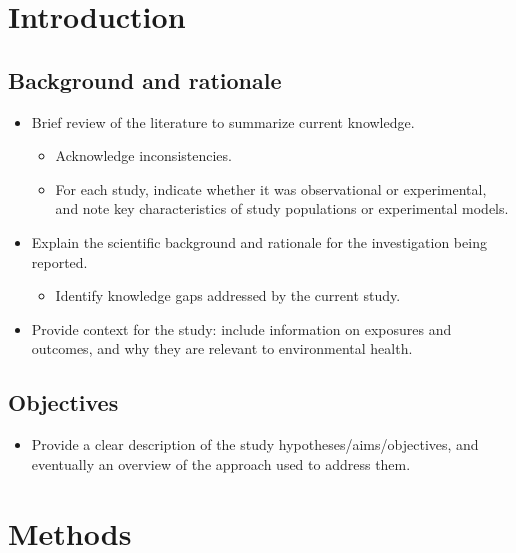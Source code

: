 \documentclass[
  letterpaper,
  DIV=11,
  numbers=noendperiod]{scrartcl}
\providecommand{\tightlist}{%
  \setlength{\itemsep}{0pt}\setlength{\parskip}{0pt}}\usepackage{longtable,booktabs,array}
\begin{document}
\hypertarget{sec-intro}{%
\section{Introduction}\label{sec-intro}}

\hypertarget{sec-background}{%
\subsection{Background and rationale}\label{sec-background}}

\begin{itemize}
\tightlist
\item
  Brief review of the literature to summarize current knowledge.

  \begin{itemize}
  \tightlist
  \item
    Acknowledge inconsistencies.
  \item
    For each study, indicate whether it was observational or
    experimental, and note key characteristics of study populations or
    experimental models.
  \end{itemize}
\item
  Explain the scientific background and rationale for the investigation
  being reported.

  \begin{itemize}
  \tightlist
  \item
    Identify knowledge gaps addressed by the current study.
  \end{itemize}
\item
  Provide context for the study: include information on exposures and
  outcomes, and why they are relevant to environmental health.
\end{itemize}

\hypertarget{sec-objectives}{%
\subsection{Objectives}\label{sec-objectives}}

\begin{itemize}
\tightlist
\item
  Provide a clear description of the study hypotheses/aims/objectives,
  and eventually an overview of the approach used to address them.
\end{itemize}

\hypertarget{sec-methods}{%
\section{Methods}\label{sec-methods}}
\end{document}
